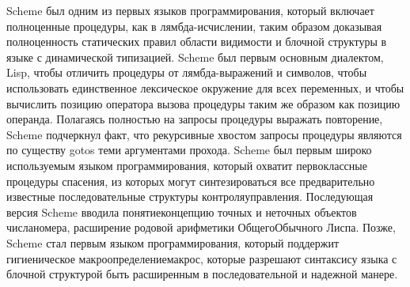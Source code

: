 Scheme был одним из первых языков программирования, который включает полноценные процедуры, как
в лямбда-исчислении, таким образом доказывая полноценность статических правил области видимости и
блочной структуры в языке с динамической типизацией. Scheme был первым основным диалектом,
Lisp, чтобы отличить процедуры от лямбда-выражений и символов, чтобы использовать
единственное лексическое окружение для всех переменных, и чтобы вычислить
позицию оператора вызова процедуры таким же образом как позицию
операнда. Полагаясь полностью на запросы процедуры выражать повторение, Scheme подчеркнул факт,
что рекурсивные хвостом запросы процедуры являются по существу gotos теми аргументами
прохода. Scheme был первым широко используемым языком программирования, который охватит
первоклассные процедуры спасения, из которых могут синтезироваться все предварительно известные
последовательные структуры контроля{управления}. Последующая версия Scheme вводила
понятие{концепцию} точных и неточных объектов числа{номера}, расширение родовой арифметики
Общего{Обычного} Лиспа. Позже, Scheme стал первым языком программирования, который поддержит
гигиеническое макроопределение{макрос}, которые разрешают синтаксису языка с блочной структурой
быть расширенным в последовательной и надежной манере.


